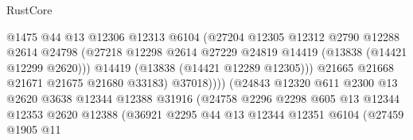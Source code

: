 \begin{lexlean}{RustCore}
\begin{coremodule}
                                        @1475
                                        @44
                                        @13
                                        @12306
                                        @12313
                                        @6104
                                        (@27204
                                          @12305
                                          @12312
                                          @2790
                                          @12288
                                          @2614
                                          @24798
                                          (@27218
                                            @12298
                                            @2614
                                            @27229
                                            @24819
                                            @14419
                                            (@13838 (@14421 @12299 @2620)))
                                          @14419
                                          (@13838 (@14421 @12289 @12305)))
                                        @21665
                                        @21668
                                        @21671
                                        @21675
                                        @21680
                                        @33183)
                                      @37018))))
                              (@24843
                                @12320
                                @611
                                @2300
                                @13
                                @2620
                                @3638
                                @12344
                                @12388
                                @31916
                                (@24758
                                  @2296
                                  @2298
                                  @605
                                  @13
                                  @12344
                                  @12353
                                  @2620
                                  @12388
                                  (@36921
                                    @2295
                                    @44
                                    @13
                                    @12344
                                    @12351
                                    @6104
                                    (@27459
                                      @1905
                                      @11

\end{coremodule}
\end{lexlean}
